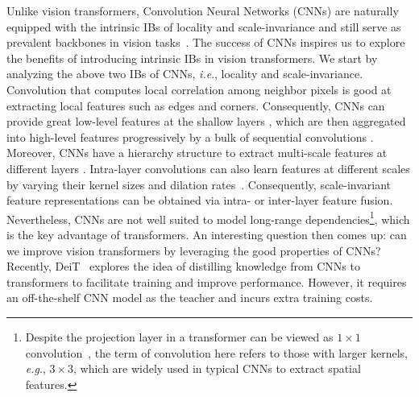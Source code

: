 \documentclass[twocolumn]{svjour3}          \smartqed  \usepackage{natbib}
\newcommand{\ie}{i.e}
\newcommand{\eg}{e.g}
\def\onedot{.\xspace}
\def\eg{\emph{e.g}\onedot}
\def\ie{\emph{i.e}\onedot}
\begin{document}
Unlike vision transformers, Convolution Neural Networks (CNNs) are naturally equipped with the intrinsic IBs of locality and scale-invariance and still serve as prevalent backbones in vision tasks~\citep{he2016deep,szegedy2017inception,chen2017rethinking,zhao2017pyramid}. The success of CNNs inspires us to explore the benefits of introducing intrinsic IBs in vision transformers. We start by analyzing the above two IBs of CNNs, \ie, locality and scale-invariance. Convolution that computes local correlation among neighbor pixels is good at extracting local features such as edges and corners. Consequently, CNNs can provide great low-level features at the shallow layers \citep{zeiler2014visualizing}, which are then aggregated into high-level features progressively by a bulk of sequential convolutions \citep{huang2017densely,simonyan2014very,szegedy2015going}. Moreover, CNNs have a hierarchy structure to extract multi-scale features at different layers \citep{simonyan2014very,krizhevsky2012imagenet,he2016deep}. Intra-layer convolutions can also learn features at different scales by varying their kernel sizes and dilation rates~\citep{he2015spatial,szegedy2017inception,chen2017rethinking,lin2017feature,zhao2017pyramid}. Consequently, scale-invariant feature representations can be obtained via intra- or inter-layer feature fusion. Nevertheless, CNNs are not well suited to model long-range dependencies\footnote{Despite the projection layer in a transformer can be viewed as $1\times 1$ convolution~\citep{chen2021empirical}, the term of convolution here refers to those with larger kernels, \eg, $3 \times 3$, which are widely used in typical CNNs to extract spatial features.}, which is the key advantage of transformers. An interesting question then comes up: can we improve vision transformers by leveraging the good properties of CNNs? Recently, DeiT~\citep{touvron2020training} explores the idea of distilling knowledge from CNNs to transformers to facilitate training and improve performance. However, it requires an off-the-shelf CNN model as the teacher and incurs extra training costs.
\end{document}
